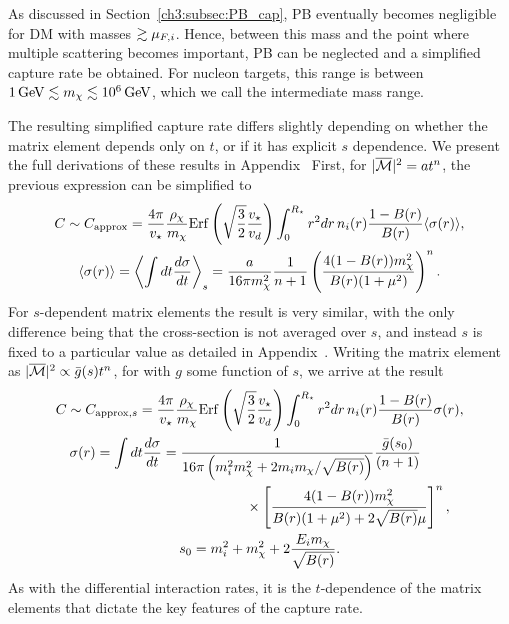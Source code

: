 As discussed in Section~\ref{ch3:subsec:PB_cap}, PB eventually becomes negligible for DM with masses $\gtrsim \mu_{F,i}$. Hence, between this mass and the point where multiple scattering becomes important, PB can be neglected and a simplified capture rate be obtained. For nucleon targets, this range is between $1{\rm \,GeV}\lesssim m_\chi\lesssim 10^6{\rm \,GeV}$, which we call the intermediate mass range.

The resulting simplified capture rate differs slightly depending on whether the matrix element depends only on $t$, or if it has explicit $s$ dependence. We present the full derivations of these results in Appendix~
First, for $|\overline{\mathcal M}|^2=a t^n$, the previous expression can be simplified to 
\begin{gather}
        C \sim C_\mathrm{approx} = \frac{4\pi}{v_\star} \frac{\rho_\chi}{m_\chi}{\rm Erf}\left(\sqrt{\frac{3}{2}}\frac{v_\star}{v_d}\right)\int_0^{R_\star}  r^2 dr \, n_i(r)  \frac{1-B(r)}{B(r)} \langle\sigma(r)\rangle 
\label{ch3:eq:csimplelargemtext}, \\
\langle\sigma(r)\rangle = \left\langle\int dt \frac{d\sigma}{dt} \right\rangle_s =   \frac{a}{16\pi m_\chi^2 } \frac{1}{n+1}\left(\frac{4(1-B(r))m_\chi^2}{B(r)(1+\mu^2)}\right)^{n}. 
\label{ch3:eq:xsecave}
\end{gather}
For $s$-dependent matrix elements the result is very similar, with the only difference being that the cross-section is not averaged over $s$, and instead $s$ is fixed to a particular value as detailed in Appendix~. Writing the matrix element as $|\overline{\mathcal M}|^2 \propto \bar{g}(s)t^n$, for with $g$ some function of $s$, we arrive at the result
\begin{gather}
    C \sim C_{\mathrm{approx}, s} = \frac{4\pi}{v_\star} \frac{\rho_\chi}{m_\chi}{\rm Erf}\left(\sqrt{\frac{3}{2}}\frac{v_\star}{v_d}\right)\int_0^{R_\star}  r^2 dr \, n_i(r)  \frac{1-B(r)}{B(r)} \sigma(r)
\label{ch3:eq:csimplelargemtext_sdep}, \\
\begin{split}
    \sigma(r) = \int dt \frac{d\sigma}{dt} & =   \frac{1}{16\pi \left(m_i^2 m_\chi^2 + 2m_i m_\chi/\sqrt{B(r)}\right)}\frac{\bar{g}(s_0)}{(n+1)}\\
    &\hspace{6em}\times\left[\frac{4(1 - B(r)) m_\chi^2}{B(r)(1 + \mu^2) + 2\sqrt{B(r)}\mu}\right]^n,
\label{ch3:eq:xsecave_sdep}
\end{split}\\
s_0 = m_i^2 + m_\chi^2 + 2\frac{E_im_\chi}{\sqrt{B(r)}}.\label{ch3:eq:s0}
\end{gather}
As with the differential interaction rates, it is the $t$-dependence of the matrix elements that dictate the key features of the capture rate.

